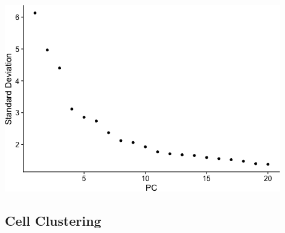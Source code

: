 \documentclass[]{article}
\begin{document}
\includegraphics{figures/GSE160729-scale-pca-4.png}

\hypertarget{cell-clustering}{%
\subsection{Cell Clustering}\label{cell-clustering}}
\end{document}

